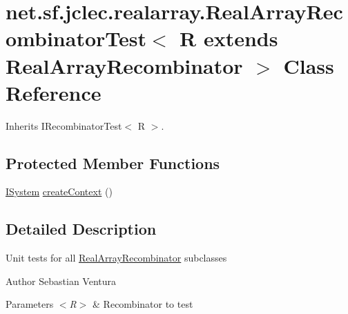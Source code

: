 \hypertarget{classnet_1_1sf_1_1jclec_1_1realarray_1_1_real_array_recombinator_test_3_01_r_01extends_01_real_array_recombinator_01_4}{\section{net.\-sf.\-jclec.\-realarray.\-Real\-Array\-Recombinator\-Test$<$ R extends Real\-Array\-Recombinator $>$ Class Reference}
\label{classnet_1_1sf_1_1jclec_1_1realarray_1_1_real_array_recombinator_test_3_01_r_01extends_01_real_array_recombinator_01_4}
}


Inherits I\-Recombinator\-Test$<$ R $>$.

\subsection*{Protected Member Functions}
\begin{DoxyCompactItemize}
\item 
\hyperlink{interfacenet_1_1sf_1_1jclec_1_1_i_system}{I\-System} \hyperlink{classnet_1_1sf_1_1jclec_1_1realarray_1_1_real_array_recombinator_test_3_01_r_01extends_01_real_array_recombinator_01_4_a91757cc271f3d3fb9faab758b5034690}{create\-Context} ()
\end{DoxyCompactItemize}


\subsection{Detailed Description}
Unit tests for all \hyperlink{classnet_1_1sf_1_1jclec_1_1realarray_1_1_real_array_recombinator}{Real\-Array\-Recombinator} subclasses

\begin{DoxyAuthor}{Author}
Sebastian Ventura
\end{DoxyAuthor}

\begin{DoxyParams}{Parameters}
{\em $<$\-R$>$} & Recombinator to test \\
\hline
\end{DoxyParams}


